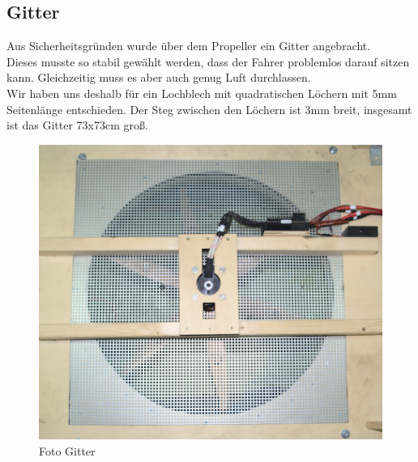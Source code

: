 \subsection{Gitter}
Aus Sicherheitsgründen wurde über dem Propeller ein Gitter angebracht.\\
Dieses musste so stabil gewählt werden, dass der Fahrer problemlos darauf sitzen kann. Gleichzeitig muss es aber auch genug Luft durchlassen.\\
Wir haben uns deshalb für ein Lochblech mit quadratischen Löchern mit 5mm Seitenlänge entschieden. Der Steg zwischen den Löchern ist 3mm breit, insgesamt ist das Gitter 73x73cm groß.\\
\begin{figure}[H]
    \centering
    \includegraphics[width=.7\textwidth]{Fotos/Konstruktion/DSC_8815.png}
    \caption{Foto Gitter \label{fig:konst:gitter}}    
\end{figure}

\clearpage
